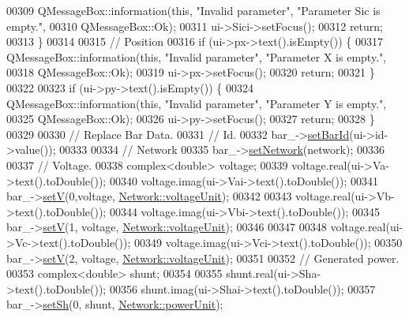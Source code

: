 \begin{DoxyCode}
00309     QMessageBox::information(\textcolor{keyword}{this}, \textcolor{stringliteral}{"Invalid parameter"}, \textcolor{stringliteral}{"Parameter Sic is empty."},
00310                              QMessageBox::Ok);
00311     ui->Sici->setFocus();
00312     \textcolor{keywordflow}{return};
00313   \}
00314 
00315   \textcolor{comment}{// Position}
00316   \textcolor{keywordflow}{if} (ui->px->text().isEmpty()) \{
00317     QMessageBox::information(\textcolor{keyword}{this}, \textcolor{stringliteral}{"Invalid parameter"}, \textcolor{stringliteral}{"Parameter X is empty."},
00318                              QMessageBox::Ok);
00319     ui->px->setFocus();
00320     \textcolor{keywordflow}{return};
00321   \}
00322 
00323   \textcolor{keywordflow}{if} (ui->py->text().isEmpty()) \{
00324     QMessageBox::information(\textcolor{keyword}{this}, \textcolor{stringliteral}{"Invalid parameter"}, \textcolor{stringliteral}{"Parameter Y is empty."},
00325                              QMessageBox::Ok);
00326     ui->py->setFocus();
00327     \textcolor{keywordflow}{return};
00328   \}
00329 
00330   \textcolor{comment}{// Replace Bar Data.}
00331   \textcolor{comment}{// Id.}
00332   bar\_->\hyperlink{group___models_gae3cf341a76cc4589fe3203d0a3ed2ac0}{setBarId}(ui->id->value());
00333 
00334   \textcolor{comment}{// Network}
00335   bar\_->\hyperlink{group___models_gade9a307fdb6a81871787899ec1af5833}{setNetwork}(network);
00336 
00337   \textcolor{comment}{// Voltage.}
00338   complex<double> voltage;
00339   voltage.real(ui->Va->text().toDouble());
00340   voltage.imag(ui->Vai->text().toDouble());
00341   bar\_->\hyperlink{group___models_ga8d1e70b2d11ed4245e81b8b20858079d}{setV}(0,voltage, \hyperlink{group___models_gacde031ef95f5c05565ee35769f2ed89e}{Network::voltageUnit});
00342 
00343   voltage.real(ui->Vb->text().toDouble());
00344   voltage.imag(ui->Vbi->text().toDouble());
00345   bar\_->\hyperlink{group___models_ga8d1e70b2d11ed4245e81b8b20858079d}{setV}(1, voltage, \hyperlink{group___models_gacde031ef95f5c05565ee35769f2ed89e}{Network::voltageUnit});
00346 
00347 
00348   voltage.real(ui->Vc->text().toDouble());
00349   voltage.imag(ui->Vci->text().toDouble());
00350   bar\_->\hyperlink{group___models_ga8d1e70b2d11ed4245e81b8b20858079d}{setV}(2, voltage, \hyperlink{group___models_gacde031ef95f5c05565ee35769f2ed89e}{Network::voltageUnit});
00351 
00352   \textcolor{comment}{// Generated power.}
00353   complex<double> shunt;
00354 
00355   shunt.real(ui->Sha->text().toDouble());
00356   shunt.imag(ui->Shai->text().toDouble());
00357   bar\_->\hyperlink{group___models_gafd91c7f15566b9d5a68a197efeaeaf26}{setSh}(0, shunt, \hyperlink{group___models_ga9504015bc566f4a3d3b4d4a86000293b}{Network::powerUnit});

\end{DoxyCode}
